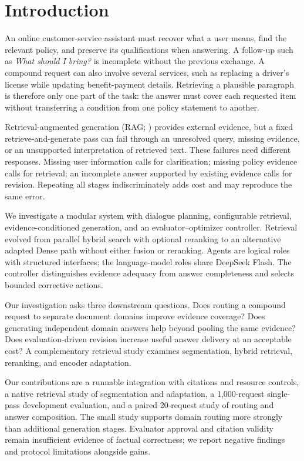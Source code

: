 \section{Introduction}
An online customer-service assistant must recover what a user means, find the relevant policy, and preserve its qualifications when answering. A follow-up such as \emph{What should I bring?} is incomplete without the previous exchange. A compound request can also involve several services, such as replacing a driver's license while updating benefit-payment details. Retrieving a plausible paragraph is therefore only one part of the task: the answer must cover each requested item without transferring a condition from one policy statement to another.

Retrieval-augmented generation (RAG; \citealt{lewis2020rag}) provides external evidence, but a fixed retrieve-and-generate pass can fail through an unresolved query, missing evidence, or an unsupported interpretation of retrieved text. These failures need different responses. Missing user information calls for clarification; missing policy evidence calls for retrieval; an incomplete answer supported by existing evidence calls for revision. Repeating all stages indiscriminately adds cost and may reproduce the same error.

We investigate a modular system with dialogue planning, configurable retrieval, evidence-conditioned generation, and an evaluator--optimizer controller. Retrieval evolved from parallel hybrid search with optional reranking to an alternative adapted Dense path without either fusion or reranking. Agents are logical roles with structured interfaces; the language-model roles share DeepSeek Flash. The controller distinguishes evidence adequacy from answer completeness and selects bounded corrective actions.

Our investigation asks three downstream questions. Does routing a compound request to separate document domains improve evidence coverage? Does generating independent domain answers help beyond pooling the same evidence? Does evaluation-driven revision increase useful answer delivery at an acceptable cost? A complementary retrieval study examines segmentation, hybrid retrieval, reranking, and encoder adaptation.

Our contributions are a runnable integration with citations and resource controls, a native retrieval study of segmentation and adaptation, a 1,000-request single-pass development evaluation, and a paired 20-request study of routing and answer composition. The small study supports domain routing more strongly than additional generation stages. Evaluator approval and citation validity remain insufficient evidence of factual correctness; we report negative findings and protocol limitations alongside gains.
